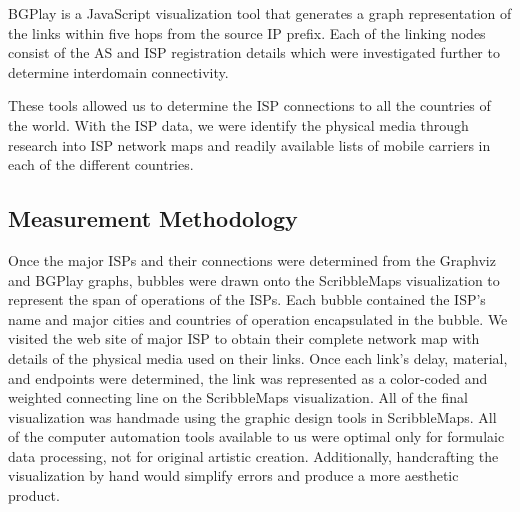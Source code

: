\documentclass{sigcomm-alternate}
\begin{document}
BGPlay is a JavaScript visualization tool that generates a graph representation of the links within five hops from the source IP prefix. Each of the linking nodes consist of the AS and ISP registration details which were investigated further to determine interdomain connectivity. 

These tools allowed us to determine the ISP connections to all the countries of the world. With the ISP data, we were identify the physical media through research into ISP network maps and readily available lists of mobile carriers in each of the different countries.
 

\subsection{Measurement Methodology}

Once the major ISPs and their connections were determined from the Graphviz and BGPlay graphs, bubbles were drawn onto the ScribbleMaps visualization to represent the span of operations of the ISPs. Each bubble contained the ISP's name and major cities and countries of operation encapsulated in the bubble. We visited the web site of major ISP to obtain their complete network map with details of the physical media used on their links. Once each link's delay, material, and endpoints were determined, the link was represented as a color-coded and weighted connecting line on the ScribbleMaps visualization. All of the final visualization was handmade using the graphic design tools in ScribbleMaps. All of the computer automation tools available to us were optimal only for formulaic data processing, not for original artistic creation. Additionally, handcrafting the visualization by hand would simplify errors and produce a more aesthetic product.
\end{document}

